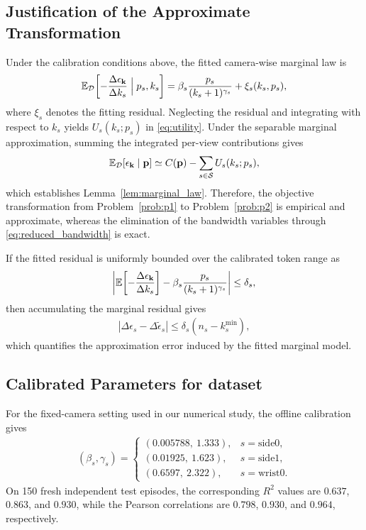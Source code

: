 \documentclass[lettersize,journal]{IEEEtran}
\theoremstyle{custom}
\begin{document}
\subsection{Justification of the Approximate Transformation}
Under the calibration conditions above, the fitted camera-wise marginal law is
\begin{align}
    \mathbb E_{\mathcal D}\!\left[
    -\frac{\Delta\epsilon_{\bf k}}{\Delta k_s}
    \Bigm|p_s,k_s\right]
    =\beta_s\frac{p_s}{(k_s+1)^{\gamma_s}}+\xi_s(k_s,p_s),
\end{align}
where $\xi_s$ denotes the fitting residual. Neglecting the residual and integrating with respect to $k_s$ yields $U_s(k_s;p_s)$ in \eqref{eq:utility}. Under the separable marginal approximation, summing the integrated per-view contributions gives
\begin{align}
    \mathbb E_{\mathcal D}[\epsilon_{\bf k}\mid{\bf p}]
    \simeq C({\bf p})-\sum_{s\in\mathcal S}U_s(k_s;p_s),
\end{align}
which establishes Lemma~\ref{lem:marginal_law}. Therefore, the objective transformation from Problem~\ref{prob:p1} to Problem~\ref{prob:p2} is empirical and approximate, whereas the elimination of the bandwidth variables through \eqref{eq:reduced_bandwidth} is exact.

If the fitted residual is uniformly bounded over the calibrated token range as
\begin{align}
\left|
\mathbb E\!\left[-\frac{\Delta\epsilon_{\bf k}}{\Delta k_s}\right]
-\beta_s\frac{p_s}{(k_s+1)^{\gamma_s}}
\right|\leq \delta_s,
\end{align}
then accumulating the marginal residual gives
\begin{align}
    \left|\Delta\epsilon_s-\Delta\widetilde\epsilon_s\right|
    \leq \delta_s\left(n_s-k_s^{\min}\right),
\end{align}
which quantifies the approximation error induced by the fitted marginal model.

\subsection{Calibrated Parameters for dataset \cite{}}
For the fixed-camera setting used in our numerical study, the offline calibration gives
\begin{align}
(\beta_s,\gamma_s)=
\begin{cases}
(0.005788,\ 1.333), & s=\mathrm{side0},\\
(0.01925,\ 1.623), & s=\mathrm{side1},\\
(0.6597,\ 2.322), & s=\mathrm{wrist0}.
\end{cases}\label{eq:fitted_params}
\end{align}
On 150 fresh independent test episodes, the corresponding $R^2$ values are $0.637$, $0.863$, and $0.930$, while the Pearson correlations are $0.798$, $0.930$, and $0.964$, respectively.
\end{document}
